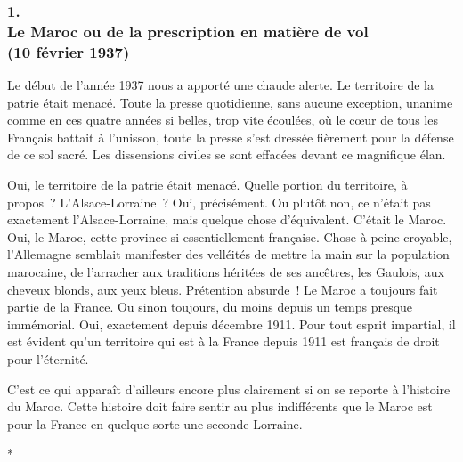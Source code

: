\documentclass[french,twoside]{book} %
\begin{document}
\subsubsection[{1. Le Maroc ou de la prescription en matière de vol, (10 février 1937)}]{1. \\
Le Maroc ou de la prescription en matière de vol \\
(10 février 1937)}
\noindent \par
Le début de l'année 1937 nous a apporté une chaude alerte. Le territoire de la patrie était menacé. Toute la presse quotidienne, sans aucune exception, unanime comme en ces quatre années si belles, trop vite écoulées, où le cœur de tous les Français battait à l'unisson, toute la presse s'est dressée fièrement pour la défense de ce sol sacré. Les dissensions civiles se sont effacées devant ce magnifique élan.\par
Oui, le territoire de la patrie était menacé. Quelle portion du territoire, à propos ? L'Alsace-Lorraine ? Oui, précisément. Ou plutôt non, ce n'était pas exactement l'Alsace-Lorraine, mais quelque chose d'équivalent. C'était le Maroc. Oui, le Maroc, cette province si essentiellement française. Chose à peine croyable, l'Allemagne semblait manifester des velléités de mettre la main sur la population marocaine, de l'arracher aux traditions héritées de ses ancêtres, les Gaulois, aux cheveux blonds, aux yeux bleus. Prétention absurde ! Le Maroc a toujours fait partie de la France. Ou sinon toujours, du moins depuis un temps presque immémorial. Oui, exactement depuis décembre 1911. Pour tout esprit impartial, il est évident qu'un territoire qui est à la France depuis 1911 est français de droit pour l'éternité.\par
C'est ce qui apparaît d'ailleurs encore plus clairement si on se reporte à l'histoire du Maroc. Cette histoire doit faire sentir au plus indifférents que le Maroc est pour la France en quelque sorte une seconde Lorraine.\par

\begin{center}
\noindent \centerline{*}\par
\end{center}
\end{document}

